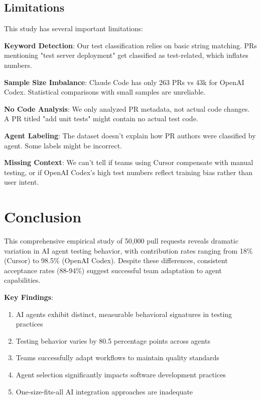 \documentclass[conference]{IEEEtran}
\begin{document}
{{\subsection{Limitations}

This study has several important limitations:

\textbf{Keyword Detection}: Our test classification relies on basic string matching. PRs mentioning "test server deployment" get classified as test-related, which inflates numbers.

\textbf{Sample Size Imbalance}: Claude Code has only 263 PRs vs 43k for OpenAI Codex. Statistical comparisons with small samples are unreliable.

\textbf{No Code Analysis}: We only analyzed PR metadata, not actual code changes. A PR titled "add unit tests" might contain no actual test code.

\textbf{Agent Labeling}: The dataset doesn't explain how PR authors were classified by agent. Some labels might be incorrect.

\textbf{Missing Context}: We can't tell if teams using Cursor compensate with manual testing, or if OpenAI Codex's high test numbers reflect training bias rather than user intent.

\section{Conclusion}

This comprehensive empirical study of 50,000 pull requests reveals dramatic variation in AI agent testing behavior, with contribution rates ranging from 18\% (Cursor) to 98.5\% (OpenAI Codex). Despite these differences, consistent acceptance rates (88-94\%) suggest successful team adaptation to agent capabilities.

\textbf{Key Findings}:
\begin{enumerate}
    \item AI agents exhibit distinct, measurable behavioral signatures in testing practices
    \item Testing behavior varies by 80.5 percentage points across agents
    \item Teams successfully adapt workflows to maintain quality standards
    \item Agent selection significantly impacts software development practices
    \item One-size-fits-all AI integration approaches are inadequate
\end{enumerate}

}}
\end{document}
